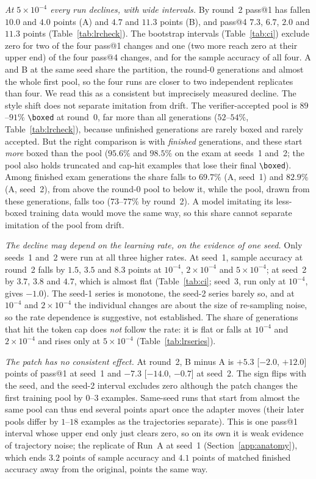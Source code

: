 \documentclass[runningheads]{llncs}
\begin{document}
\emph{At $5\times10^{-4}$ every run declines, with wide intervals.} By round~2
pass@1 has fallen $10.0$ and $4.0$ points (A) and $4.7$ and $11.3$ points (B), and
pass@4 $7.3$, $6.7$, $2.0$ and $11.3$ points (Table~\ref{tab:lrcheck}). The
bootstrap intervals (Table~\ref{tab:ci}) exclude zero for two of the four
pass@1 changes and one (two more reach zero at their upper end) of the four pass@4 changes, and for the sample
accuracy of all four. A and B at the same seed share the partition, the round-0
generations and almost the whole first pool, so the four runs are closer to two
independent replicates than four. We read this as a consistent but imprecisely
measured decline. The style shift does not separate imitation from drift. The
verifier-accepted pool is $89$--$91\%$ \verb|\boxed| at round~0, far more than
all generations ($52$--$54\%$, Table~\ref{tab:lrcheck}), because unfinished
generations are rarely boxed and rarely accepted. But the right comparison is
with \emph{finished} generations, and these start \emph{more} boxed than the
pool ($95.6\%$ and $98.5\%$ on the exam at seeds~1 and~2; the pool also holds
truncated and cap-hit examples that lose their final \verb|\boxed|). Among
finished exam generations the share falls to $69.7\%$ (A, seed~1) and $82.9\%$
(A, seed~2), from above the round-0 pool to below it, while the pool, drawn
from these generations, falls too ($73$--$77\%$ by round~2). A model imitating
its less-boxed training data would move the same way, so this share cannot
separate imitation of the pool from drift.

\emph{The decline may depend on the learning rate, on the evidence of one
seed.} Only seeds~1 and~2 were run at all three higher rates. At seed~1, sample
accuracy at round~2 falls by $1.5$, $3.5$ and $8.3$ points at $10^{-4}$,
$2\times10^{-4}$ and $5\times10^{-4}$; at seed~2 by $3.7$, $3.8$ and $4.7$, which
is almost flat (Table~\ref{tab:ci}; seed~3, run only at $10^{-4}$, gives
$-1.0$). The seed-1 series is monotone, the seed-2 series barely so, and at
$10^{-4}$ and $2\times10^{-4}$ the individual changes are about the size of
re-sampling noise, so the rate dependence is suggestive, not established. The
share of generations that hit the token cap does \emph{not} follow the rate:
it is flat or falls at $10^{-4}$ and $2\times10^{-4}$ and rises only at
$5\times10^{-4}$ (Table~\ref{tab:lrseries}).

\emph{The patch has no consistent effect.} At round~2, B minus A is $+5.3$ [$-2.0$, $+12.0$]
points of pass@1 at seed~1 and $-7.3$ [$-14.0$, $-0.7$] at seed~2. The sign flips with the seed, and
the seed-2 interval excludes zero although the patch changes the first training
pool by $0$--$3$ examples. Same-seed runs that start from almost the same pool
can thus end several points apart once the adapter moves (their later pools
differ by $1$--$18$ examples as the trajectories separate). This is one pass@1
interval whose upper end only just clears zero, so on its own it is weak
evidence of trajectory noise; the replicate of Run~A at seed~1
(Section~\ref{app:anatomy}), which ends $3.2$ points of sample accuracy and
$4.1$ points of matched finished accuracy away from the original, points the
same way.
\end{document}
